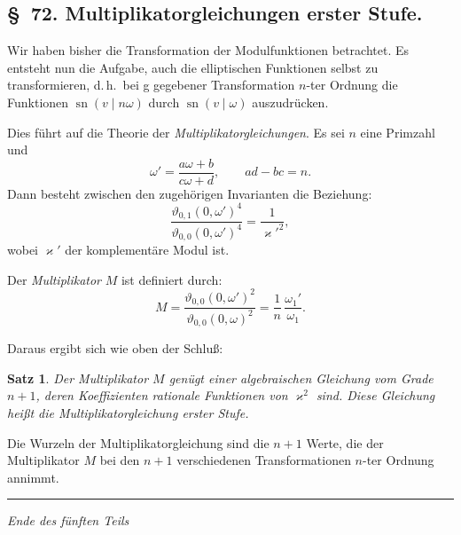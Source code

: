 \documentclass[11pt,a4paper]{article}
\theoremstyle{plain}
\newtheorem*{satz}{Satz}
\theoremstyle{remark}
\begin{document}
\subsection*{§~72. Multiplikatorgleichungen erster Stufe.}

Wir haben bisher die Transformation der Modulfunktionen
betrachtet. Es entsteht nun die Aufgabe, auch die
elliptischen Funktionen selbst zu transformieren, d.\,h.\ bei
g gegebener Transformation $n$-ter Ordnung die Funktionen
$\operatorname{sn}(v\mid n\omega)$ durch
$\operatorname{sn}(v\mid\omega)$ auszudrücken.

Dies führt auf die Theorie der \emph{Multiplikatorgleichungen}.
Es sei $n$ eine Primzahl und
\begin{equation}\label{eq:72:1}
\omega' = \frac{a\omega+b}{c\omega+d},\qquad ad-bc=n.
\end{equation}
Dann besteht zwischen den zugehörigen Invarianten die
Beziehung:
\begin{equation}\label{eq:72:2}
\frac{\vartheta_{0,1}(0,\omega')^4}{\vartheta_{0,0}(0,\omega')^4}
= \frac{1}{\varkappa'^2},
\end{equation}
wobei $\varkappa'$ der komplementäre Modul ist.

Der \emph{Multiplikator} $M$ ist definiert durch:
\begin{equation}\label{eq:72:3}
M = \frac{\vartheta_{0,0}(0,\omega')^2}
         {\vartheta_{0,0}(0,\omega)^2}
= \frac{1}{n}\,\frac{\omega_1'}{\omega_1}.
\end{equation}

Daraus ergibt sich wie oben der Schluß:
\begin{satz}
Der Multiplikator $M$ genügt einer algebraischen Gleichung vom
Grade $n+1$, deren Koeffizienten rationale Funktionen von
$\varkappa^2$ sind. Diese Gleichung heißt die
Multiplikatorgleichung erster Stufe.
\end{satz}

Die Wurzeln der Multiplikatorgleichung sind die $n+1$ Werte,
die der Multiplikator $M$ bei den $n+1$ verschiedenen
Transformationen $n$-ter Ordnung annimmt.

\vspace{1\baselineskip}
\noindent\rule{\textwidth}{0.4pt}
\vspace{0.5\baselineskip}

\begin{center}
\textit{Ende des fünften Teils}
\end{center}
\end{document}
